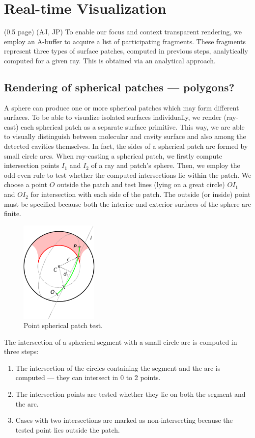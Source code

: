 \section{Real-time Visualization} (0.5 page) (AJ, JP)
\label{sec:vis}
To enable our focus and context transparent rendering, we employ an A-buffer to acquire a list of participating fragments. These fragments represent three types of surface patches, computed in previous steps, analytically computed for a given ray. This is obtained via an analytical approach.
\subsection{Rendering of spherical patches --- polygons?}
\label{sec:spherical-patches}
A sphere can produce one or more spherical patches which may form different surfaces.
To be able to visualize isolated surfaces individually, we render (ray-cast) each spherical patch as a separate surface primitive.
This way, we are able to visually distinguish between molecular and cavity surface and also among the detected cavities themselves.
In fact, the sides of a spherical patch are formed by small circle arcs.
When ray-casting a spherical patch, we firstly compute intersection points $I_1$ and $I_2$ of a ray and patch's sphere.
Then, we employ the odd-even rule to test whether the computed intersections lie within the patch.
We choose a point $O$ outside the patch and test lines (lying on a great circle) $OI_1$ and $OI_2$ for intersection with each side of the patch.
The outside (or inside) point must be specified because both the interior and exterior surfaces of the sphere are finite.

\begin{figure}[htb]
  \centering
  \includegraphics[width=1.5in]{image/patch.png}
  \caption{Point spherical patch test.}
\end{figure}

The intersection of a spherical segment with a small circle arc is computed in three steps:
\begin{enumerate}
  \item The intersection of the circles containing the segment and the arc is computed --- they can intersect in 0 to 2 points.
  \item The intersection points are tested whether they lie on both the segment and the arc.
  \item Cases with two intersections are marked as non-intersecting because the tested point lies outside the patch.
\end{enumerate}

